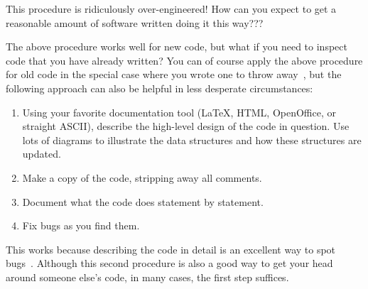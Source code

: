 \QuickQuiz{}
	This procedure is ridiculously over-engineered!
	How can you expect to get a reasonable amount of software
	written doing it this way???
 \QuickQuizEnd

The above procedure works well for new code, but what if you need to
inspect code that you have already written?
You can of course apply the above procedure for old code in the special
case where you wrote one to throw away~\cite{Brooks79},
but the following approach can also be helpful in less desperate
circumstances:

\begin{enumerate}
\item	Using your favorite documentation tool (\LaTeX{}, HTML,
	OpenOffice, or straight ASCII), describe the high-level
	design of the code in question.
	Use lots of diagrams to illustrate the data structures
	and how these structures are updated.
\item	Make a copy of the code, stripping away all comments.
\item	Document what the code does statement by statement.
\item	Fix bugs as you find them.
\end{enumerate}

This works because describing the code in detail is an excellent way to spot
bugs~\cite{GlenfordJMyers1979}.
Although this second procedure is also a good way to get your head around
someone else's code, in many cases, the first step suffices.

